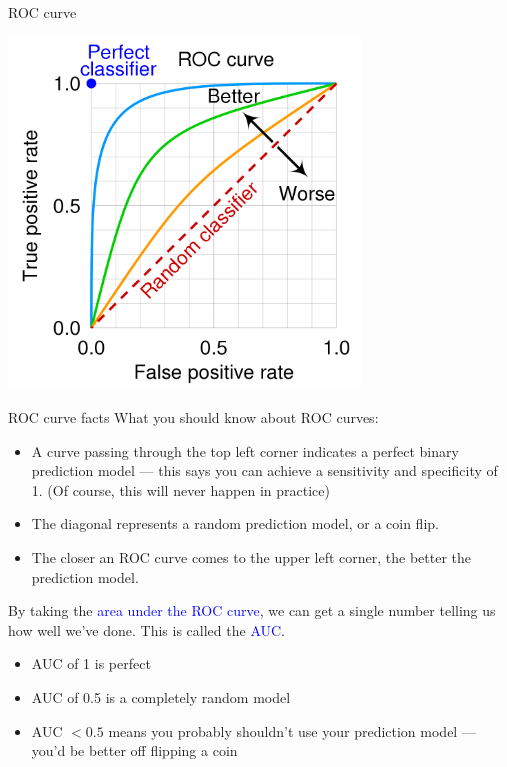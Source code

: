 \documentclass[10pt,t]{beamer}
\begin{document}
\begin{frame}{ROC curve}
	\vspace{-0.3cm}
	\begin{center}
	\includegraphics[width=0.7\textwidth]{./figs/roc_curve_example}
	\end{center}
\end{frame}

\begin{frame}{ROC curve facts}
	What you should know about ROC curves:
	\begin{itemize}
		\item A curve passing through the top left corner indicates a perfect binary prediction model --- this says you can achieve a sensitivity and specificity of 1. (Of course, this will never happen in practice) \pause
		\item The diagonal represents a random prediction model, or a coin flip. \pause
		\item The closer an ROC curve comes to the upper left corner, the better the prediction model. \pause
	\end{itemize}
	By taking the \textcolor{blue}{area under the ROC curve}, we can get a single number telling us how well we've done. This is called the \textcolor{blue}{AUC}. \pause
	\begin{itemize}
		\item AUC of 1 is perfect\pause
		\item AUC of 0.5 is a completely random model\pause
		\item AUC $<0.5$ means you probably shouldn't use your prediction model --- you'd be better off flipping a coin
	\end{itemize}
\end{frame}
\end{document}

